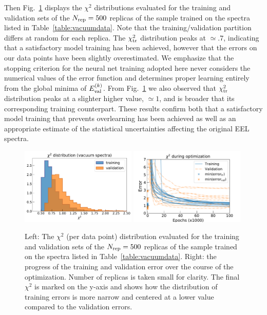     Then Fig.~\ref{fig:chi2_distributions} displays  the $\chi^2$  distributions
    evaluated for the training and validation sets
      of the $N_{\rm rep}=500$ replicas of the sample trained on the spectra
      listed in Table~\ref{table:vacuumdata}.
      Note that the training/validation partition differs at random for each replica.
      The $\chi^2_{\rm tr}$ distribution peaks at $\simeq .7$, indicating that a satisfactory model training
      has been achieved, however that the errors on our data points have been slightly overestimated.
      We emphasize that the stopping criterion for the neural net training adopted here never considers
      the numerical values of the error function and determines proper learning entirely from
      the global minima of $E_{\rm val}^{(k)}$.
      From Fig.~\ref{fig:chi2_distributions} we also observed that  $\chi^2_{\rm tr}$ distribution peaks at
      a slighter higher value, $\simeq 1$, and is broader that its corresponding training counterpart.
      These results confirm both that a satisfactory model training that prevents overlearning
      has been achieved as well as an appropriate estimate of the statistical uncertainties
      affecting the original EEL spectra.
    
\begin{figure}[t]
    \centering
    \includegraphics[width=0.49\textwidth]{plots/chi2_distributions.pdf}
    \includegraphics[width=0.49\textwidth]{plots/train_val_error_271.pdf}
    \caption{Left: The $\chi^2$ (per data point) distribution evaluated for the training and validation sets
      of the $N_{\rm rep}=500$ replicas of the sample trained on the spectra
      listed in Table~\ref{table:vacuumdata}. Right: the progress of the training and validation error over
      the course of the optimization. Number of replicas is taken small for clarity.
      The final $\chi^2$ is marked on the y-axis and shows how the distribution of training errors
      is more narrow and centered at a lower value compared to the validation errors. }
    \label{fig:chi2_distributions}
\end{figure}

